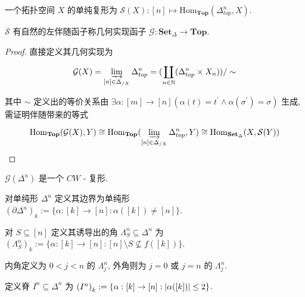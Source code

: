 \begin{definition}
    一个拓扑空间 \(X\) 的单纯复形为 \(\mathcal{S} (X) : [n] \mapsto \mathrm{Hom}_{\mathbf{Top}} (\Delta^n_{top}, X)\).
\end{definition}

\begin{lemma}
    \(\mathcal{S}\) 有自然的左伴随函子称几何实现函子 \(\mathcal{G} : \mathbf{Set}_{\Delta} \to \mathbf{Top}\).

    \begin{proof}
        直接定义其几何实现为

        \[
            \mathcal{G} (X) = \varinjlim_{[n] \in \Delta_{/X}} \Delta^n_{top} = (\coprod_{n \in \mathbb{N}} (\Delta^n_{top} \times X_n)) / \sim
        \]

        其中 \(\sim\) 定义出的等价关系由 \(\exists \alpha : [m] \to [n] (\alpha(t) = t^\prime \land \alpha(\sigma^\prime) = \sigma)\) 生成, 需证明伴随带来的等式

        \[
            \mathrm{Hom}_{\mathbf{Top}} (\mathcal{G} (X),Y) \cong \mathrm{Hom}_{\mathbf{Top}} (\varinjlim_{[n] \in \Delta_{/X}} \Delta^n_{top},Y) \cong \mathrm{Hom}_{\mathbf{Set}_{\Delta}} (X,\mathcal{S} (Y))
        \]
    \end{proof}
\end{lemma}

\begin{remark}
    \(\mathcal{G} (\Delta^n)\) 是一个 \(CW\) - 复形.
\end{remark}

\begin{definition}[边界]
    对单纯形 \(\Delta^n\) 定义其边界为单纯形 \({(\partial \Delta^n)}_k := \{\alpha : [k] \to [n] : \alpha ([k]) \neq [n]\}\).
\end{definition}

\begin{definition}[角]
    对 \(S \subseteq [n]\) 定义其诱导出的角 \(\Lambda_S^n \subseteq \Delta^n\) 为 \({(\Lambda_S^n)}_k := \{\alpha : [k] \to [n] : [n] \setminus S \nsubseteq f([k])\}\).

    内角定义为 \(0 < j < n\) 的 \(\Lambda^n_j\), 外角则为 \(j = 0\) 或 \(j = n\) 的 \(\Lambda^n_j\).
\end{definition}

\begin{definition}
    定义脊 \(I^n \subseteq \Delta^n\) 为 \({(I^n)}_k := \{\alpha : [k] \to [n] : \abs{\alpha ([k])} \leq 2\}\).
\end{definition}

